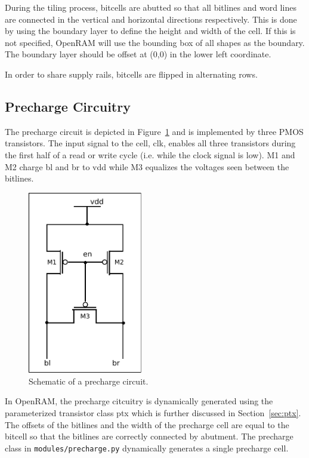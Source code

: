 During the tiling process, bitcells are abutted so that all bitlines
and word lines are connected in the vertical and horizontal directions
respectively. This is done by using the boundary layer to define the
height and width of the cell. If this is not specified, OpenRAM will
use the bounding box of all shapes as the boundary. The boundary layer
should be offset at (0,0) in the lower left coordinate.

In order to share supply rails, bitcells are flipped in alternating
rows. 



\subsection{Precharge Circuitry}
\label{sec:precharge}

The precharge circuit is depicted in Figure~\ref{fig:precharge} and is
implemented by three PMOS transistors. The input signal to the cell,
clk, enables all three transistors during the first half of a read or
write cycle (i.e. while the clock signal is low).  M1 and M2 charge bl
and br to vdd while M3 equalizes the voltages seen between the bitlines.

\begin{figure}[h!]
\centering
\includegraphics[width=5cm]{./figs/precharge_schem.pdf}
\caption{Schematic of a precharge circuit.}
\label{fig:precharge}
\end{figure}

In OpenRAM, the precharge citcuitry is dynamically generated using the
parameterized transistor class ptx which is further discussed in
Section~\ref{sec:ptx}. The offsets of the bitlines and the width of
the precharge cell are equal to the bitcell so that the bitlines are
correctly connected by abutment. The precharge class in
\verb|modules/precharge.py| dynamically generates a single precharge
cell.

